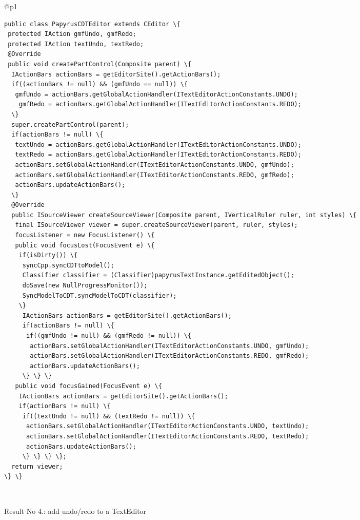 \begin{figure*}[!htb]
 \begin{minipage}{1\textwidth}
\scriptsize 
\begin{tabular}{@{}p{}} 
 \hline 
   \\ \hline
  \vspace{-4mm}
\begin{Verbatim}[commandchars=\\\{\}, tabsize=2]
public class PapyrusCDTEditor extends CEditor \{
 protected IAction gmfUndo, gmfRedo;
 protected IAction textUndo, textRedo;
 @Override
 public void createPartControl(Composite parent) \{
  IActionBars actionBars = getEditorSite().getActionBars();
  if((actionBars != null) && (gmfUndo == null)) \{
   gmfUndo = actionBars.getGlobalActionHandler(ITextEditorActionConstants.UNDO);
    gmfRedo = actionBars.getGlobalActionHandler(ITextEditorActionConstants.REDO);
  \}
  super.createPartControl(parent);
  if(actionBars != null) \{
   textUndo = actionBars.getGlobalActionHandler(ITextEditorActionConstants.UNDO);
   textRedo = actionBars.getGlobalActionHandler(ITextEditorActionConstants.REDO);
   actionBars.setGlobalActionHandler(ITextEditorActionConstants.UNDO, gmfUndo);
   actionBars.setGlobalActionHandler(ITextEditorActionConstants.REDO, gmfRedo);
   actionBars.updateActionBars();
  \}
  @Override
  public ISourceViewer createSourceViewer(Composite parent, IVerticalRuler ruler, int styles) \{
   final ISourceViewer viewer = super.createSourceViewer(parent, ruler, styles);
   focusListener = new FocusListener() \{
   public void focusLost(FocusEvent e) \{
    if(isDirty()) \{
     syncCpp.syncCDTtoModel();
     Classifier classifier = (Classifier)papyrusTextInstance.getEditedObject();
     doSave(new NullProgressMonitor());
     SyncModelToCDT.syncModelToCDT(classifier);
    \}
     IActionBars actionBars = getEditorSite().getActionBars();
     if(actionBars != null) \{
      if((gmfUndo != null) && (gmfRedo != null)) \{
       actionBars.setGlobalActionHandler(ITextEditorActionConstants.UNDO, gmfUndo);
       actionBars.setGlobalActionHandler(ITextEditorActionConstants.REDO, gmfRedo);
       actionBars.updateActionBars();
     \} \} \}
   public void focusGained(FocusEvent e) \{
    IActionBars actionBars = getEditorSite().getActionBars();
    if(actionBars != null) \{
     if((textUndo != null) && (textRedo != null)) \{
      actionBars.setGlobalActionHandler(ITextEditorActionConstants.UNDO, textUndo);
      actionBars.setGlobalActionHandler(ITextEditorActionConstants.REDO, textRedo);
      actionBars.updateActionBars();
     \} \} \} \};
  return viewer;
\} \}
 \end{Verbatim}
      \vspace{-4mm}
     \\ \hline
\end{tabular} 
\caption{Result No 4.: add undo/redo to a TextEditor}
\label{fig:undoEditor}
\end{minipage}
\end{figure*}










